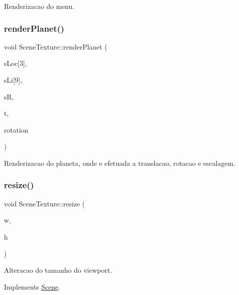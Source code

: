 Renderizacao do menu. 

\mbox{\label{class_scene_texture_a3fdce2ddec5b4d71e25d99a487e81450}} 
\subsubsection{\texorpdfstring{renderPlanet()}{renderPlanet()}}
{\footnotesize\ttfamily void Scene\+Texture\+::render\+Planet (\begin{DoxyParamCaption}\item[{float}]{s\+Loc\mbox{[}3\mbox{]},  }\item[{float}]{s\+Li\mbox{[}9\mbox{]},  }\item[{float}]{sR,  }\item[{G\+Lfloat}]{t,  }\item[{G\+Lfloat}]{rotation }\end{DoxyParamCaption})}



Renderizacao do planeta, onde e efetuada a translacao, rotacao e escalagem. 

\mbox{\label{class_scene_texture_a25d792c7e4f5eba8f9c04b28077c6804}} 
\subsubsection{\texorpdfstring{resize()}{resize()}}
{\footnotesize\ttfamily void Scene\+Texture\+::resize (\begin{DoxyParamCaption}\item[{int}]{w,  }\item[{int}]{h }\end{DoxyParamCaption})\hspace{0.3cm}{\ttfamily [virtual]}}



Alteracao do tamanho do viewport. 



Implements \mbox{\hyperlink{class_scene_a454bd0a09c125201fbb32e15d4f62fa3}{Scene}}.

\mbox{\label{class_scene_texture_afbdc7b7c4eaa91deadd5f907ca501f7b}} 
